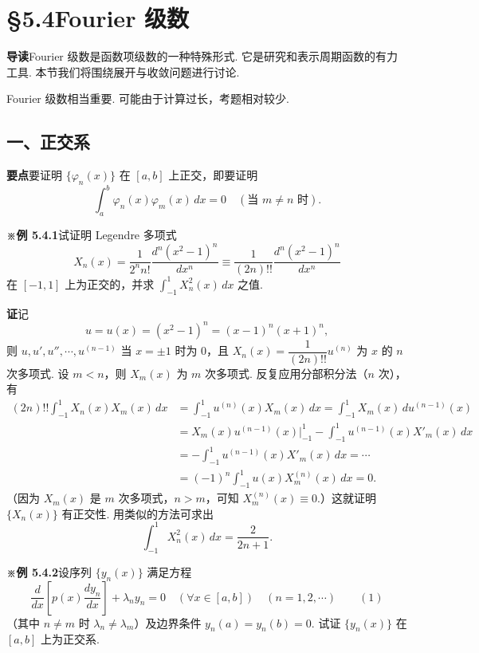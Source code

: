 \documentclass[UTF8,12pt,a4paper,fontset=fandol]{ctexart}
\begin{document}
\section*{§5.4\quad Fourier 级数}

\noindent\textbf{导读}\quad Fourier 级数是函数项级数的一种特殊形式. 它是研究和表示周期函数的有力工具. 本节我们将围绕展开与收敛问题进行讨论.

Fourier 级数相当重要. 可能由于计算过长，考题相对较少.

\subsection*{一、正交系}

\noindent\textbf{要点}\quad 要证明 $\{\varphi_n(x)\}$ 在 $[a,b]$ 上正交，即要证明
\[
  \int_a^b \varphi_n(x)\varphi_m(x)\,dx=0\quad(\text{当 }m\ne n\text{ 时}).
\]

\noindent\textbf{※例 5.4.1}\quad 试证明 Legendre 多项式
\[
  X_n(x)=\frac1{2^nn!}\frac{d^n(x^2-1)^n}{dx^n}
  \equiv\frac1{(2n)!!}\frac{d^n(x^2-1)^n}{dx^n}
\]
在 $[-1,1]$ 上为正交的，并求 $\displaystyle\int_{-1}^1X_n^2(x)\,dx$ 之值.

\noindent\textbf{证}\quad 记
\[
  u=u(x)=(x^2-1)^n=(x-1)^n(x+1)^n,
\]
则 $u,u',u'',\cdots,u^{(n-1)}$ 当 $x=\pm1$ 时为 0，且 $X_n(x)=\dfrac1{(2n)!!}u^{(n)}$ 为 $x$ 的 $n$ 次多项式. 设 $m<n$，则 $X_m(x)$ 为 $m$ 次多项式. 反复应用分部积分法（$n$ 次），有
\[
\begin{aligned}
(2n)!!\int_{-1}^1X_n(x)X_m(x)\,dx
&=\int_{-1}^1u^{(n)}(x)X_m(x)\,dx
=\int_{-1}^1X_m(x)\,du^{(n-1)}(x)\\
&=X_m(x)u^{(n-1)}(x)\bigg|_{-1}^1
-\int_{-1}^1u^{(n-1)}(x)X'_m(x)\,dx\\
&=-\int_{-1}^1u^{(n-1)}(x)X'_m(x)\,dx
=\cdots\\
&=(-1)^n\int_{-1}^1u(x)X_m^{(n)}(x)\,dx=0.
\end{aligned}
\]
（因为 $X_m(x)$ 是 $m$ 次多项式，$n>m$，可知 $X_m^{(n)}(x)\equiv0$.）这就证明 $\{X_n(x)\}$ 有正交性. 用类似的方法可求出
\[
  \int_{-1}^1X_n^2(x)\,dx=\frac2{2n+1}.
\]

\noindent\textbf{※例 5.4.2}\quad 设序列 $\{y_n(x)\}$ 满足方程
\[
  \frac d{dx}\left[p(x)\frac{dy_n}{dx}\right]+\lambda_ny_n=0\quad
  (\forall x\in[a,b])\quad(n=1,2,\cdots) \qquad(1)
\]
（其中 $n\ne m$ 时 $\lambda_n\ne\lambda_m$）及边界条件 $y_n(a)=y_n(b)=0$. 试证 $\{y_n(x)\}$ 在 $[a,b]$ 上为正交系.
\end{document}
